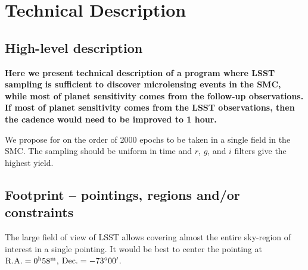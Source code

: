 \documentclass[12pt,letterpaper]{article}
\begin{document}
\section{Technical Description}



\subsection{High-level description}

{\bf Here we present technical description of a program where LSST 
sampling is sufficient to discover microlensing events in the SMC, 
while most of planet sensitivity comes from the follow-up observations.  
If most of planet sensitivity comes from the LSST observations, 
then the cadence would need to be improved to 1 hour.  
}

We propose for on the order of 2000 epochs %
to be taken in a single field in the SMC.  
The sampling should be uniform in time and $r$, $g$, and $i$ 
filters give the highest yield.

\subsection{Footprint -- pointings, regions and/or constraints}

The large field of view of LSST allows covering almost the entire sky-region 
of interest in a single pointing. 
It would be best to center the pointing at  
${\rm R.A.} = 0^{\rm h}58^{\rm m}$,  %
${\rm Dec.} = -73^{\circ}00'$. 
\end{document}
